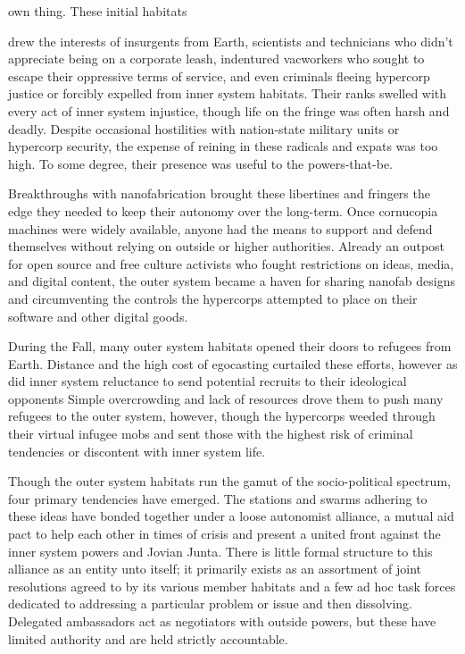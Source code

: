 own thing. These initial habitats 

drew the interests of insurgents 
from Earth, scientists and technicians who 
didn't appreciate being on a corporate 
leash, indentured vacworkers who sought 
to escape their oppressive terms of service, 
and even criminals fleeing hypercorp justice
or forcibly expelled from inner system
habitats. Their ranks swelled with every 
act of inner system injustice, though life 
on the fringe was often harsh and deadly. 
Despite occasional hostilities with nation-state
military units or hypercorp security,
the expense of reining in these radicals and 
expats was too high. To some degree, their 
presence was useful to the powers-that-be.

Breakthroughs with nanofabrication 
brought these libertines and fringers the 
edge they needed to keep their autonomy 
over the long-term. Once cornucopia 
machines were widely available, anyone 
had the means to support and defend 
themselves without relying on outside or 
higher authorities. Already an outpost for 
open source and free culture activists who 
fought restrictions on ideas, media, and 
digital content, the outer system became 
a haven for sharing nanofab designs and 
circumventing the controls the hypercorps 
attempted to place on their software and 
other digital goods.

During the Fall, many outer system 
habitats opened their doors to refugees 
from Earth. Distance and the high cost of 
egocasting curtailed these efforts, however
as did inner system reluctance to send
potential recruits to their ideological opponents
Simple overcrowding and lack
of resources drove them to push many 
refugees to the outer system, however, 
though the hypercorps weeded through 
their virtual infugee mobs and sent those 
with the highest risk of criminal tendencies
or discontent with inner system life.

Though the outer system habitats run 
the gamut of the socio-political spectrum, 
four primary tendencies have emerged. 
The stations and swarms adhering to these 
ideas have bonded together under a loose 
autonomist alliance, a mutual aid pact 
to help each other in times of crisis and 
present a united front against the inner 
system powers and Jovian Junta. There is 
little formal structure to this alliance as an 
entity unto itself; it primarily exists as an 
assortment of joint resolutions agreed to 
by its various member habitats and a few 
ad hoc task forces dedicated to addressing
a particular problem or issue and then
dissolving. Delegated ambassadors act 
as negotiators with outside powers, but 
these have limited authority and are held 
strictly accountable.

